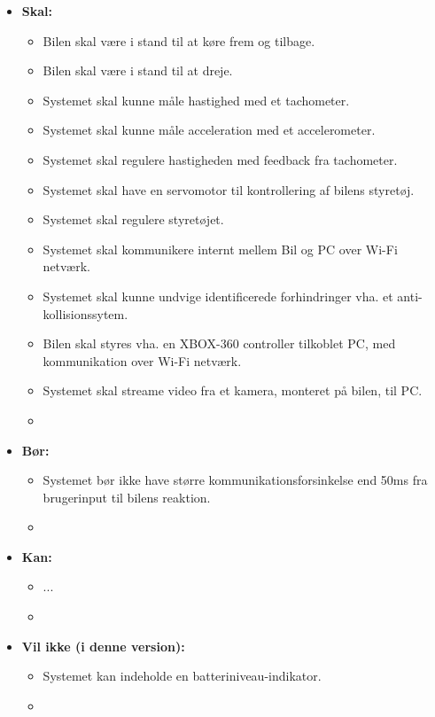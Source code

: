 \begin{itemize}\itemsep1pt \parskip0pt 
	\item \textbf{Skal:}
		\begin{itemize}\itemsep1pt \parskip0pt 
			\item Bilen skal være i stand til at køre frem og tilbage.
			\item Bilen skal være i stand til at dreje.
			\item Systemet skal kunne måle hastighed med et tachometer.
			\item Systemet skal kunne måle acceleration med et accelerometer.
			\item Systemet skal regulere hastigheden med feedback fra tachometer.
			\item Systemet skal have en servomotor til kontrollering af bilens styretøj.
			\item Systemet skal regulere styretøjet.
			\item Systemet skal kommunikere internt mellem Bil og PC over Wi-Fi netværk.
			\item Systemet skal kunne undvige identificerede forhindringer vha. et anti-kollisionssytem. 
			\item Bilen skal styres vha. en XBOX-360 controller tilkoblet PC, med kommunikation over Wi-Fi netværk.
			\item Systemet skal streame video fra et kamera, monteret på bilen, til PC.
			\item 
		\end{itemize}
	\item \textbf{Bør:}
		\begin{itemize}\itemsep1pt \parskip0pt 
			\item Systemet bør ikke have større kommunikationsforsinkelse end 50ms fra brugerinput til bilens reaktion.
			\item %
		\end{itemize}
	\item \textbf{Kan:}	
		\begin{itemize}\itemsep1pt \parskip0pt 
			\item ...
			\item %
		\end{itemize}
	\item \textbf{Vil ikke (i denne version):}	
		\begin{itemize}\itemsep1pt \parskip0pt 
			\item Systemet kan indeholde en batteriniveau-indikator.
			\item %
		\end{itemize}
\end{itemize}